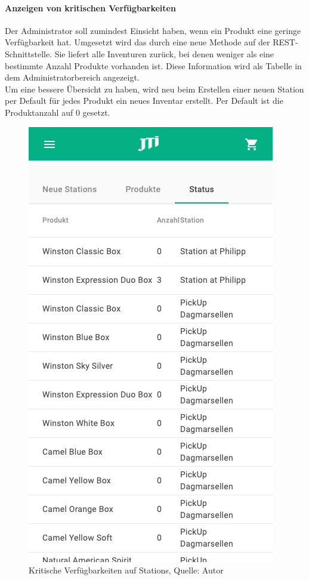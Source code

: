 \paragraph{Anzeigen von kritischen Verfügbarkeiten}\label{verfugbarkeiten}
Der Administrator soll zumindest Einsicht haben, wenn ein Produkt eine geringe Verfügbarkeit hat. Umgesetzt wird das durch eine neue Methode auf der \ac{REST}-Schnittstelle. Sie liefert alle Inventuren zurück, bei denen weniger als eine bestimmte Anzahl Produkte vorhanden ist. Diese Information wird als Tabelle in dem Administratorbereich angezeigt. \\
Um eine bessere Übersicht zu haben, wird neu beim Erstellen einer neuen Station per Default für jedes Produkt ein neues Inventar erstellt. Per Default ist die Produktanzahl auf 0 gesetzt. 
\begin{figure}[H]
	\centering
	\includegraphics[scale=0.2]{images/stationStatus.png}
	\caption[Kritische Verfügbarkeiten auf Stations]{Kritische Verfügbarkeiten auf Stations, Quelle: Autor}
	\label{img: stationStatus}
\end{figure} 

